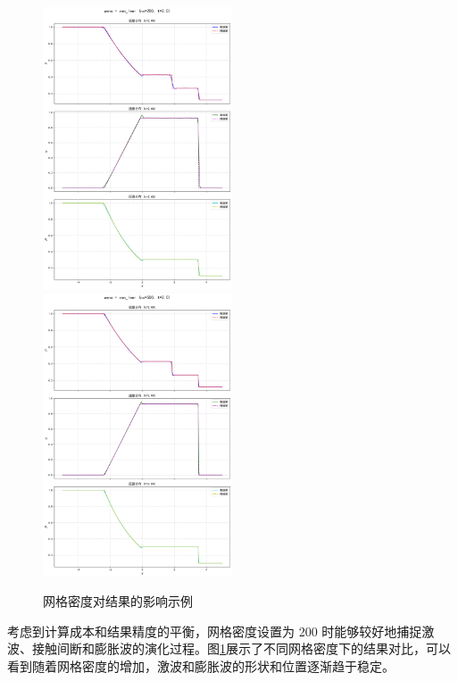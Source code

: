 \documentclass[UTF8]{ctexart}
\begin{document}
\begin{figure}
    \includegraphics[width=0.5\textwidth]{200.png}
    \includegraphics[width=0.5\textwidth]{500.png}
    \caption{网格密度对结果的影响示例}
    \label{fig:grid_effect}
\end{figure}
考虑到计算成本和结果精度的平衡，网格密度设置为 200 时能够较好地捕捉激波、接触间断和膨胀波的演化过程。图\ref{fig:grid_effect}展示了不同网格密度下的结果对比，可以看到随着网格密度的增加，激波和膨胀波的形状和位置逐渐趋于稳定。
\end{document}

